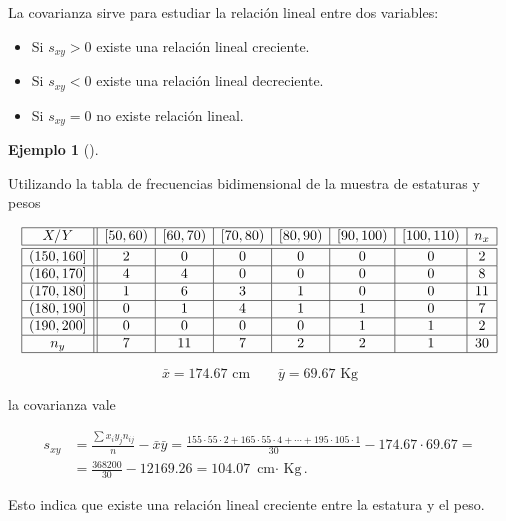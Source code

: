 \documentclass[
  spanish,
  a4paper,
]{scrreport}
\providecommand{\tightlist}{%
  \setlength{\itemsep}{0pt}\setlength{\parskip}{0pt}}
\theoremstyle{plain}
\theoremstyle{definition}
\newtheorem{example}{Ejemplo}[chapter]
\theoremstyle{definition}
\theoremstyle{remark}
\begin{document}
\begin{tcolorbox}[enhanced jigsaw, arc=.35mm, bottomrule=.15mm, bottomtitle=1mm, breakable, colback=white, colbacktitle=quarto-callout-note-color!10!white, colframe=quarto-callout-note-color-frame, coltitle=black, left=2mm, leftrule=.75mm, opacityback=0, opacitybacktitle=0.6, rightrule=.15mm, title=\textcolor{quarto-callout-note-color}{\faInfo}\hspace{0.5em}{Interpretación}, titlerule=0mm, toprule=.15mm, toptitle=1mm]

La covarianza sirve para estudiar la relación lineal entre dos
variables:

\begin{itemize}
\tightlist
\item
  Si \(s_{xy}>0\) existe una relación lineal creciente.
\item
  Si \(s_{xy}<0\) existe una relación lineal decreciente.
\item
  Si \(s_{xy}=0\) no existe relación lineal.
\end{itemize}

\end{tcolorbox}

\begin{example}[]\protect\hypertarget{exm-covarianza}{}\label{exm-covarianza}

Utilizando la tabla de frecuencias bidimensional de la muestra de
estaturas y pesos

\[
\begin{array}{|c||c|c|c|c|c|c|c|}
\hline
  X/Y & [50,60) & [60,70) & [70,80) & [80,90) & [90,100) & [100,110) & n_x\\
  \hline\hline
  (150,160] & 2 & 0 & 0 & 0 & 0 & 0 & 2\\
  \hline
  (160,170] & 4 & 4 & 0 & 0 & 0 & 0 & 8\\
  \hline
  (170,180] & 1 & 6 & 3 & 1 & 0 & 0 & 11 \\
  \hline
  (180,190] & 0 & 1 & 4 & 1 & 1 & 0 & 7 \\
  \hline
  (190,200] & 0 & 0 & 0 & 0 & 1 & 1 & 2\\
  \hline
  n_y & 7 & 11 & 7 & 2 & 2 & 1 & 30\\
  \hline
\end{array}
\]

\[\bar x = 174.67 \mbox{ cm} \qquad \bar y = 69.67 \mbox{ Kg}\]

la covarianza vale

\begin{align*}
s_{xy} &=\frac{\sum x_iy_jn_{ij}}{n}-\bar x\bar y =  \frac{155\cdot 55\cdot 2 + 165\cdot 55\cdot 4 + \cdots + 195\cdot 105\cdot 1}{30}-174.67\cdot 69.67 =\\
& = \frac{368200}{30}-12169.26 = 104.07 \mbox{ cm$\cdot$ Kg}.
\end{align*}

Esto indica que existe una relación lineal creciente entre la estatura y
el peso.

\end{example}
\end{document}

